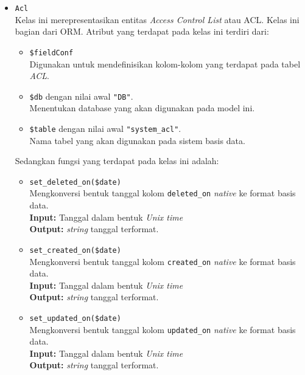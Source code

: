 \begin{itemize}
        \item \texttt{Acl} \\
            Kelas ini merepresentasikan entitas \textit{Access Control List}
            atau ACL. Kelas ini bagian dari ORM. Atribut yang terdapat pada
            kelas ini terdiri dari:
            \begin{itemize}
                \item \texttt{\$fieldConf} \\
                    Digunakan untuk mendefinisikan kolom-kolom yang terdapat
                    pada tabel \textit{ACL}.
                \item \texttt{\$db} dengan nilai awal \texttt{"DB"}. \\
                    Menentukan database yang akan digunakan pada model ini.
                \item \texttt{\$table} dengan nilai awal \texttt{"system\_acl"}.
                \\
                    Nama tabel yang akan digunakan pada sistem basis data. 
            \end{itemize}
            Sedangkan fungsi yang terdapat pada kelas ini adalah:
            \begin{itemize}
                \item \texttt{set\_deleted\_on(\$date)}\\
                    Mengkonversi bentuk tanggal kolom \texttt{deleted\_on}
                    \textit{native} ke format basis data. \\
                    \textbf{Input:} Tanggal dalam bentuk \textit{Unix time}\\
                    \textbf{Output:} \textit{string} tanggal terformat.
                
                \item \texttt{set\_created\_on(\$date)} \\
                    Mengkonversi bentuk tanggal kolom \texttt{created\_on}
                    \textit{native} ke format basis data. \\
                    \textbf{Input:} Tanggal dalam bentuk \textit{Unix time}\\
                    \textbf{Output:} \textit{string} tanggal terformat.
                
                \item \texttt{set\_updated\_on(\$date)} \\
                    Mengkonversi bentuk tanggal kolom \texttt{updated\_on}
                    \textit{native} ke format basis data. \\
                    \textbf{Input:} Tanggal dalam bentuk \textit{Unix time}\\
                    \textbf{Output:} \textit{string} tanggal terformat.
                

\end{itemize}
\end{itemize}
